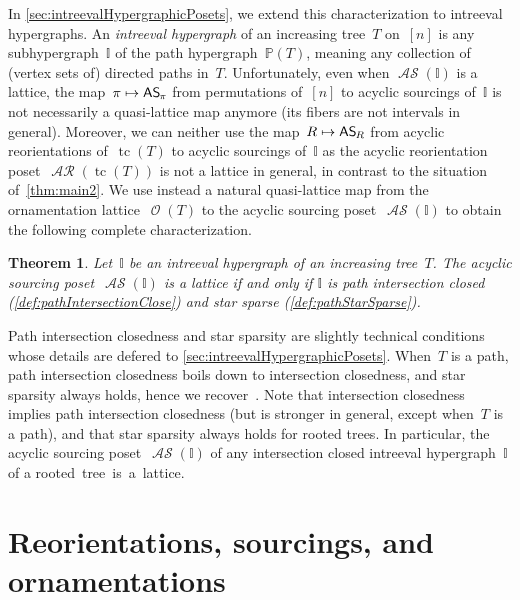\documentclass{amsart}
\newtheorem{theorem}{Theorem}[section]
\theoremstyle{definition}
\renewcommand{\c}[1]{\mathcal{#1}} %
\DeclareMathOperator{\tc}{tc} %
\newcommand{\darkblue}{\color{darkblue}} %
\newcommand{\defn}[1]{\textsl{\darkblue #1}} %
\newcommand{\mymap}[2]{\mathsf{#1}_{\hspace{-.7pt}#2}}
\DeclareMathOperator{\Orn}{\c{O}}  %
\DeclareMathOperator{\AReori}{\c{AR}}  %
\DeclareMathOperator{\ASour}{\mathcal{AS}}  %
\newcommand{\asour}[1]{\mymap{AS}{#1}}  %
\newcommand{\II}{\mathbb I} %
\newcommand{\PP}{\mathbb P} %
\begin{document}
In \cref{sec:intreevalHypergraphicPosets}, we extend this characterization to intreeval hypergraphs.
An \defn{intreeval hypergraph} of an increasing tree~$T$ on~$[n]$ is any subhypergraph~$\II$ of the path hypergraph~$\PP(T)$, meaning any collection of (vertex sets of) directed paths in~$T$.
Unfortunately, even when $\ASour(\II)$ is a lattice, the map~$\pi \mapsto \asour{\pi}$ from permutations of~$[n]$ to acyclic sourcings of~$\II$ is not necessarily a quasi-lattice map anymore (its fibers are not intervals in general).
Moreover, we can neither use the map~$R \mapsto \asour{R}$ from acyclic reorientations of~$\tc(T)$ to acyclic sourcings of~$\II$ as the acyclic reorientation poset~$\AReori(\tc(T))$ is not a lattice in general, in contrast to the situation of~\cref{thm:main2}.
We use instead a natural quasi-lattice map from the ornamentation lattice~$\Orn(T)$ to the acyclic sourcing poset~$\ASour(\II)$ to obtain the following complete characterization.

\begin{theorem}
\label{thm:main3}
Let~$\II$ be an intreeval hypergraph of an increasing tree~$T$.
The acyclic sourcing poset~$\ASour(\II)$ is a lattice if and only if $\II$ is path intersection closed (\cref{def:pathIntersectionClose}) and star sparse (\cref{def:pathStarSparse}).
\end{theorem}

\enlargethispage{.2cm}
Path intersection closedness and star sparsity are slightly technical conditions whose details are defered to \cref{sec:intreevalHypergraphicPosets}.
When~$T$ is a path, path intersection closedness boils down to intersection closedness, and star sparsity always holds, hence we recover~\cite[Thm.~A]{BergeronPilaud}.
Note that intersection closedness implies path intersection closedness (but is stronger in general, except when~$T$ is a path), and that star sparsity always holds for rooted trees.
In particular, the acyclic sourcing poset~$\ASour(\II)$ of any intersection closed intreeval hypergraph~$\II$ of a rooted~tree~is~a~lattice.


\clearpage
\section{Reorientations, sourcings, and ornamentations}
\label{sec:general}
\end{document}
